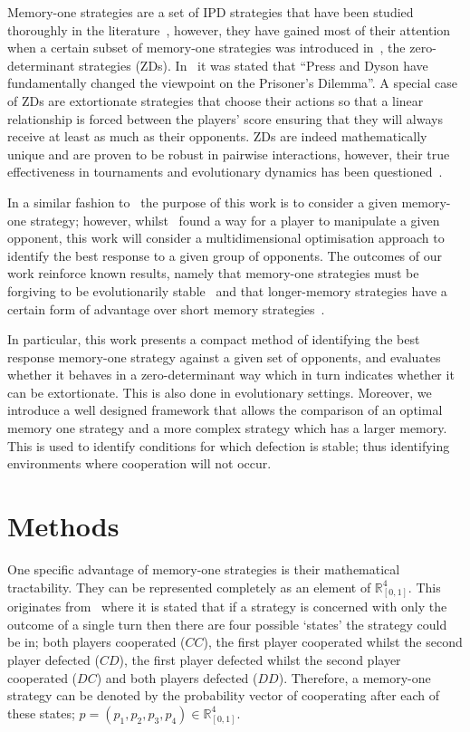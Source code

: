 \documentclass[10pt]{article}
\newcommand{\R}{\mathbb{R}}
\begin{document}
Memory-one strategies are a set of IPD strategies that have been
studied thoroughly in the literature~\cite{Nowak1990, Nowak1993}, however, they have gained
most of their attention when a certain subset of memory-one strategies was
introduced in~\cite{Press2012}, the zero-determinant strategies (ZDs). In~\cite{Stewart2012} it
was stated that ``Press and Dyson have fundamentally changed the viewpoint on
the Prisoner's Dilemma''.
A special case of ZDs are extortionate strategies that choose their actions so that a linear relationship is forced
between the players' score ensuring that they will always
receive at least as much as their opponents. ZDs are
indeed mathematically unique and are proven to be robust in pairwise
interactions, however, their true effectiveness in tournaments and
evolutionary dynamics has been questioned~\cite{adami2013, Hilbe2013b,
Hilbe2013, Hilbe2015, Knight2018, Harper2015}.

In a similar fashion to~\cite{Press2012} the purpose of this work is to consider
a given memory-one strategy; however, whilst~\cite{Press2012} found a way for a
player to manipulate a given opponent, this work will consider a
multidimensional optimisation approach to identify the best response to a given
group of opponents. The outcomes of our work reinforce known results, namely
that memory-one strategies must be forgiving to be evolutionarily stable~\cite{Stewart2013, Stewart2016}
and that longer-memory strategies have a certain form of advantage over short memory
strategies~\cite{Hilbe2017, Pan2015}.


In particular, this work presents a compact method of
identifying the best response memory-one strategy against a given set of
opponents, and evaluates whether it behaves in a
zero-determinant way which in turn indicates whether it can be extortionate. This is also done in evolutionary settings. Moreover, we
introduce a well designed framework that allows the comparison of an optimal
memory one strategy and a more complex strategy which has a larger memory. This
is used to identify conditions for which defection is stable; thus identifying
environments where cooperation will not occur.

\section{Methods}

One specific advantage of memory-one strategies is their mathematical
tractability. They can be represented completely as an element of \(\R^{4}_{[0, 1]}\). This
originates from~\cite{Nowak1989} where it is stated that if a strategy is
concerned with only the outcome of a single turn then there are four possible
`states' the strategy could be in; both players cooperated (\(CC\)), 
the first player cooperated whilst the second player defected (\(CD\)),
the first player defected whilst the second player cooperated (\(DC\)) and
both players defected (\(DD\)).
Therefore, a memory-one strategy can be denoted by the probability vector of
cooperating after each of these states; \(p=(p_1, p_2, p_3, p_4) \in \R_{[0,1]}
^ 4\).
\end{document}
